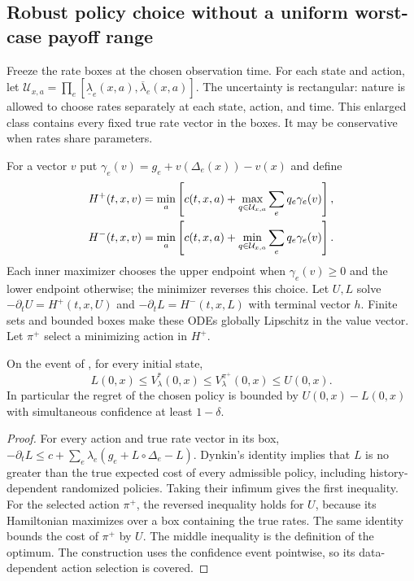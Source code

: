 \subsection{Robust policy choice without a uniform worst-case payoff range}
Freeze the rate boxes at the chosen observation time. For each state and action, let
$\mathcal U_{x,a}=\prod_e[\underline\lambda_e(x,a),\overline\lambda_e(x,a)]$.
The uncertainty is rectangular: nature is allowed to choose rates separately at each state, action, and time. This enlarged class contains every fixed true rate vector in the boxes. It may be conservative when rates share parameters.

For a vector $v$ put $\gamma_e(v)=g_e+v(\Delta_e(x))-v(x)$ and define
\begin{align}\label{eq:robust-hamiltonians}
 H^+(t,x,v)&=\min_a\left[c(t,x,a)+
       \max_{q\in\mathcal U_{x,a}}\sum_eq_e\gamma_e(v)\right],\\
 H^-(t,x,v)&=\min_a\left[c(t,x,a)+
       \min_{q\in\mathcal U_{x,a}}\sum_eq_e\gamma_e(v)\right].\notag
\end{align}
Each inner maximizer chooses the upper endpoint when $\gamma_e(v)\ge0$ and the lower endpoint otherwise; the minimizer reverses this choice. Let $U,L$ solve $-\partial_tU=H^+(t,x,U)$ and $-\partial_tL=H^-(t,x,L)$ with terminal vector $h$. Finite sets and bounded boxes make these ODEs globally Lipschitz in the value vector. Let $\pi^+$ select a minimizing action in $H^+$.

\begin{theorem}\label{thm:robust-policy}
On the event of , for every initial state,
\begin{equation}\label{eq:robust-sandwich}
 L(0,x)\le V_\lambda^*(0,x)
 \le V_\lambda^{\pi^+}(0,x)\le U(0,x).
\end{equation}
In particular the regret of the chosen policy is bounded by $U(0,x)-L(0,x)$ with simultaneous confidence at least $1-\delta$.
\end{theorem}
\begin{proof}
For every action and true rate vector in its box,
$-\partial_tL\le c+\sum_e\lambda_e(g_e+L\circ\Delta_e-L)$.
Dynkin's identity implies that $L$ is no greater than the true expected cost of every admissible policy, including history-dependent randomized policies. Taking their infimum gives the first inequality. For the selected action $\pi^+$, the reversed inequality holds for $U$, because its Hamiltonian maximizes over a box containing the true rates. The same identity bounds the cost of $\pi^+$ by $U$. The middle inequality is the definition of the optimum. The construction uses the confidence event pointwise, so its data-dependent action selection is covered.
\end{proof}

